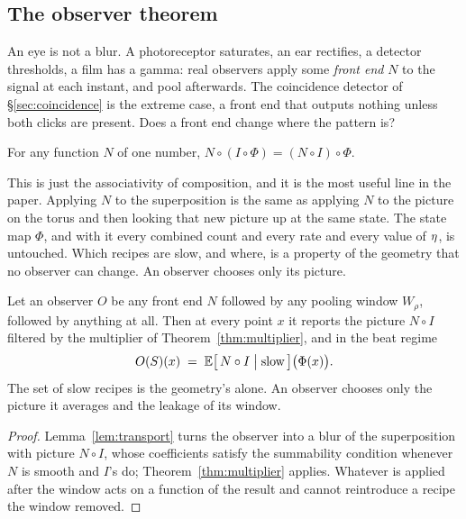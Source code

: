 \subsection{The observer theorem}
\label{sec:observer}

An eye is not a blur. A photoreceptor saturates, an ear rectifies, a
detector thresholds, a film has a gamma: real observers apply some
\emph{front end} $N$ to the signal at each instant, and pool afterwards. The
coincidence detector of \S\ref{sec:coincidence} is the extreme case, a front
end that outputs nothing unless both clicks are present. Does a front end
change where the pattern is?

\begin{lemma}
\label{lem:transport}
For any function $N$ of one number, $N\circ(I\circ\Phi)=(N\circ I)\circ\Phi$.
\end{lemma}

This is just the associativity of composition, and it is the most useful
line in the paper. Applying $N$ to the superposition is the same as applying
$N$ to the picture on the torus and then looking that new picture up at the
same state. The state map $\Phi$, and with it every combined count and every
rate and every value of $\eta$, is untouched. Which recipes are slow, and
where, is a property of the geometry that no observer can change. An
observer chooses only its picture.

\begin{theorem}
\label{thm:universality}
Let an observer $O$ be any front end $N$ followed by any pooling window
$W_\rho$, followed by anything at all. Then at every point $x$ it reports the
picture $N\circ I$ filtered by the multiplier of
Theorem~\ref{thm:multiplier}, and in the beat regime
\[
  O(S)(x)\;=\;\mathbb{E}\big[\,N\circ I\;\big|\;\text{slow}\,\big]\big(\Phi(x)\big).
\]
The set of slow recipes is the geometry's alone. An observer chooses only
the picture it averages and the leakage of its window.
\end{theorem}

\begin{proof}
Lemma~\ref{lem:transport} turns the observer into a blur of the
superposition with picture $N\circ I$, whose coefficients satisfy the
summability condition whenever $N$ is smooth and $I$'s do;
Theorem~\ref{thm:multiplier} applies. Whatever is applied after the window
acts on a function of the result and cannot reintroduce a recipe the
window removed.
\end{proof}

